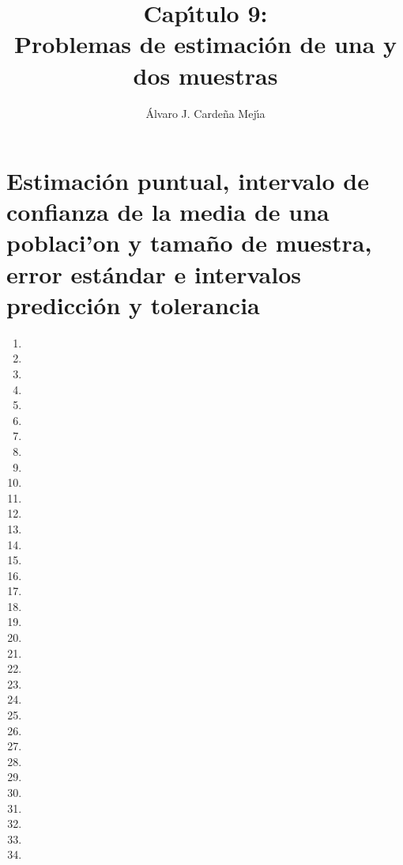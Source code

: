 \documentclass[a4paper,11pt]{article}
\title{Cap\'{\i}tulo 9:\\ Problemas de estimaci\'on de una y dos muestras}
\author{\'Alvaro J. Carde\~na Mej\'{\i}a}
\theoremstyle{teoremas}
\theoremstyle{ejemplos}
\theoremstyle{definiciones}
\theoremstyle{lemas}
\begin{document}
\maketitle

\section{Estimaci\'on puntual, intervalo de confianza de la media de una poblaci'on y tama\~no de muestra, error est\'andar e intervalos predicci\'on y tolerancia}

\begin{enumerate}
 \item  %
 \item 
 \item 
 \strut\newpage
 \item 
 \item 
 \item 
 \item 
 \item 
 \item 
 \item 
 \item 
 \item 
 \item 
 \item 
 \item 
 \item 
 \item 
 \item 
 \item 
 \item 
 \item 
 \item 
 \item 
 \newpage
 \item 
 \item 
 \item 
 \item 
 \item 
 \item 
 \item 
 \item 
 \item 
 \item 
 \item 
\end{enumerate}
\end{document}
